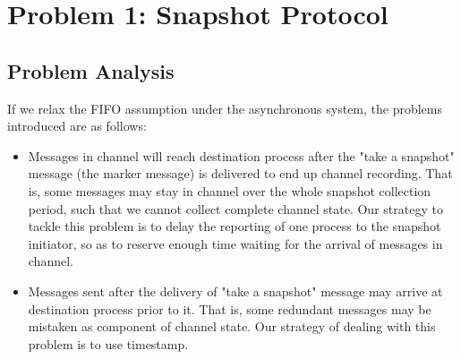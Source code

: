 \documentclass[11pt,a4paper]{article}
\begin{document}
\begin{titlepage}
    \maketitle
\end{titlepage}
\renewcommand{\contentsname}{Contents}
\begin{center} 
    \tableofcontents 
\end{center}
\newpage

\section{Problem 1: Snapshot Protocol}
\subsection{Problem Analysis}
If we relax the FIFO assumption under the asynchronous system, the problems
introduced are as follows: 
\begin{itemize}
    \item{Messages in channel will reach destination process after the "take a
            snapshot" message (the marker message) is delivered to end up
            channel recording. That is, some messages may stay in
            channel over the whole snapshot collection period, such that we
            cannot collect complete channel state. Our strategy to tackle this
            problem is to delay the reporting of one process to the snapshot
            initiator, so as to reserve enough time waiting for the arrival of
            messages in channel. }
    \item{Messages sent after the delivery of "take a snapshot" message may
            arrive at destination process prior to it. That is, some redundant
            messages may be mistaken as component of channel state. Our
            strategy of dealing with this problem is to use timestamp.} 
\end{itemize}
\end{document}
